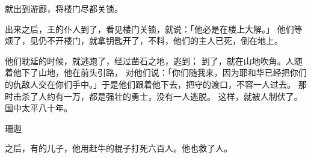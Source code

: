 {就出到游廊，将楼门尽都关锁。
\par }{\PP {}出来之后，王的仆人到了，看见楼门关锁，就说：「他必是在楼上大解。」
他们等烦了，见仍不开楼门，就拿钥匙开了，不料，他们的主人已死，倒在地上。
\par }{\PP {}他们耽延的时候，{}就逃跑了，经过凿石之地，逃到{}；
到了，就在{}山地吹角。{}人随着他下了山地，他在前头引路，
对他们说：「你们随我来，因为耶和华已经把你们的仇敌{}人交在你们手中。」于是他们跟着他下去，把守{}的渡口，不容{}一人过去。
那时击杀了{}人约有一万，都是强壮的勇士，没有一人逃脱。
这样，{}就被{}人制伏了。国中太平八十年。
\par }{\SH 珊迦
\par }{\PP {}之后，有{}的儿子{}，他用赶牛的棍子打死六百{}人。他也救了{}人。

}
